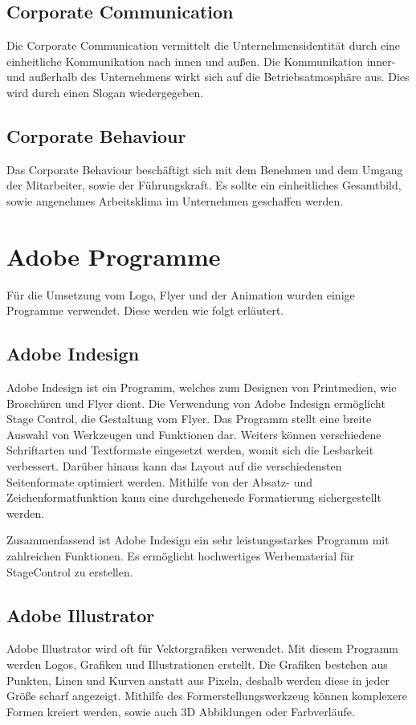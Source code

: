 \subsection{Corporate Communication}
Die Corporate Communication vermittelt die Unternehmensidentität durch eine einheitliche Kommunikation nach innen und außen. Die Kommunikation inner- und außerhalb des Unternehmens wirkt sich auf die Betriebsatmosphäre aus. Dies wird durch einen Slogan wiedergegeben.

\subsection{Corporate Behaviour}
Das Corporate Behaviour beschäftigt sich mit dem Benehmen und dem Umgang der Mitarbeiter, sowie der Führungskraft. Es sollte ein einheitliches Gesamtbild, sowie angenehmes Arbeitsklima im Unternehmen geschaffen werden. 

\section{Adobe Programme}
Für die Umsetzung vom Logo, Flyer und der Animation wurden einige Programme verwendet. Diese werden wie folgt erläutert.

\subsection{Adobe Indesign}
Adobe Indesign ist ein Programm, welches zum Designen von Printmedien, wie Broschüren und Flyer dient.
Die Verwendung von Adobe Indesign ermöglicht Stage Control, die Gestaltung vom Flyer. Das Programm stellt eine breite Auswahl von Werkzeugen und Funktionen dar. Weiters können verschiedene Schriftarten und Textformate eingesetzt werden, womit sich die Lesbarkeit verbessert. Darüber hinaus kann das Layout auf die verschiedensten Seitenformate optimiert werden. Mithilfe von der Absatz- und Zeichenformatfunktion kann eine durchgehenede Formatierung sichergestellt werden. \parencite{AdobeIndesign}

Zusammenfassend ist Adobe Indesign ein sehr leistungsstarkes Programm mit zahlreichen Funktionen. Es ermöglicht hochwertiges Werbematerial für StageControl zu erstellen.

\subsection{Adobe Illustrator}
Adobe Illustrator wird oft für Vektorgrafiken verwendet. Mit diesem Programm werden Logos, Grafiken und Illustrationen erstellt. Die Grafiken bestehen aus Punkten, Linen und Kurven anstatt aus Pixeln, deshalb werden diese in jeder Größe scharf angezeigt. Mithilfe des Formerstellungswerkzeug können komplexere Formen kreiert werden, sowie auch 3D Abbildungen oder Farbverläufe. \parencite{AdobeIllustrator}

